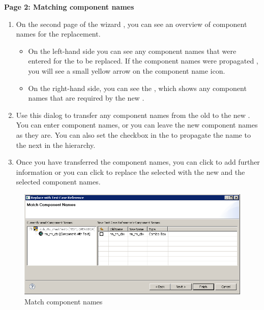 \textbf{Page 2: Matching component names}
\begin{enumerate}
\item On the second page of the wizard , you can see an overview of component names for the replacement. 
\begin{itemize}
\item On the left-hand side you can see any component names that were entered for the \gdcases{} to be replaced. If the component names were propagated , you will see a small yellow arrow on the component name icon. 
\item On the right-hand side, you can see the \gdcompnamesview{}, which shows any component names that are required by the new \gdcase{}. 
\end{itemize}
\item Use this dialog to transfer any component names from the old \gdcases{} to the new \gdcases{}. You can enter component names, or you can leave the new component names as they are. You can also set the checkbox in the \gdcompnamesview{} to propagate the name to the next \gdcase{} in the hierarchy.  
\item Once you have transferred the component names, you can click  
to add further information
or you can click  to replace the selected \gdcases{} with the new \gdcase{} and the selected component names. 
\end{enumerate}

\begin{figure}[h]
\begin{center}
\includegraphics[width=12.5cm]{Tasks/Editors/PS/ReplaceTC_CompNames}
\caption{Match component names}
\label{ReplaceTC-CompNames}
\end{center}
\end{figure} 

